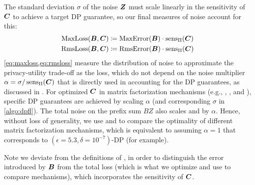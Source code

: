 The standard deviation $\sigma$ of the noise ${\bm{Z}}$ must scale linearly in the sensitivity of ${\bm{C}}$ to achieve a target DP guarantee, so our final measures of noise account for this: %
{\small %
\begin{align}
\operatorname{MaxLoss}({\bm{B}}, {\bm{C}}) &\coloneqq \operatorname{MaxError}({\bm{B}}) \cdot \operatorname{sens}_\Pi({\bm{C}}) \label{eq:maxloss} \\
\operatorname{RmsLoss}({\bm{B}}, {\bm{C}}) &\coloneqq \operatorname{RmsError}({\bm{B}}) \cdot \operatorname{sens}_\Pi({\bm{C}}) \label{eq:rmsloss}
\end{align}
}%
\cref{eq:maxloss,eq:rmsloss} measure the distribution of noise to approximate the privacy-utility trade-off as the loss, which do not depend on the noise multiplier $\alpha=\sigma/\operatorname{sens}_\Pi({\bm{C}})$ that is directly used in accounting for the DP guarantees, as discussed in \citep[Introduction]{mcmahan2024efficient}. For optimized ${\bm{C}}$ in matrix factorization mechanisms (e.g., \treeagg, \bandmf, and \blt), specific DP guarantees are achieved by scaling $\alpha$ (and corresponding $\sigma$ in \cref{algo:dpfl}). The total noise on the prefix sum $BZ$ also scales \maxloss and \rmsloss by $\alpha$. Hence, without loss of generality, we use \rmsloss and \maxloss to compare the optimality of different matrix factorization mechanisms, which is equivalent to assuming $\alpha=1$ that corresponds to $(\epsilon=5.3, \delta=10^{-7})$-DP (for example).

Note we deviate from the definitions of \citep[arXiv v3]{mcmahan2024efficient}, in order to distinguish the error introduced by ${\bm{B}}$ from the total loss (which is what we optimize and use to compare mechanisms), which incorporates the sensitivity of ${\bm{C}}$. 


 \label{sec:opt_blt}


